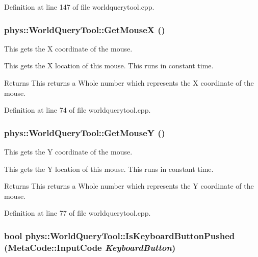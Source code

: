 Definition at line 147 of file worldquerytool.cpp.

\hypertarget{classphys_1_1WorldQueryTool_a55721f152fb117fdfb8bc6d20af6b1dc}{
\subsubsection[{GetMouseX}]{ phys::WorldQueryTool::GetMouseX ()}}
\label{d8/d69/classphys_1_1WorldQueryTool_a55721f152fb117fdfb8bc6d20af6b1dc}


This gets the X coordinate of the mouse. 

This gets the X location of this mouse. This runs in constant time. \begin{DoxyReturn}{Returns}
This returns a Whole number which represents the X coordinate of the mouse. 
\end{DoxyReturn}


Definition at line 74 of file worldquerytool.cpp.

\hypertarget{classphys_1_1WorldQueryTool_ac2d8517db7305157c1393320f434751b}{
\subsubsection[{GetMouseY}]{ phys::WorldQueryTool::GetMouseY ()}}
\label{d8/d69/classphys_1_1WorldQueryTool_ac2d8517db7305157c1393320f434751b}


This gets the Y coordinate of the mouse. 

This gets the Y location of this mouse. This runs in constant time. \begin{DoxyReturn}{Returns}
This returns a Whole number which represents the Y coordinate of the mouse. 
\end{DoxyReturn}


Definition at line 77 of file worldquerytool.cpp.

\hypertarget{classphys_1_1WorldQueryTool_a8343f54b900adb316ddc6de5405da328}{
\subsubsection[{IsKeyboardButtonPushed}]{\setlength{\rightskip}{0pt plus 5cm}bool phys::WorldQueryTool::IsKeyboardButtonPushed ({\bf MetaCode::InputCode} {\em KeyboardButton})}}
\label{d8/d69/classphys_1_1WorldQueryTool_a8343f54b900adb316ddc6de5405da328}


